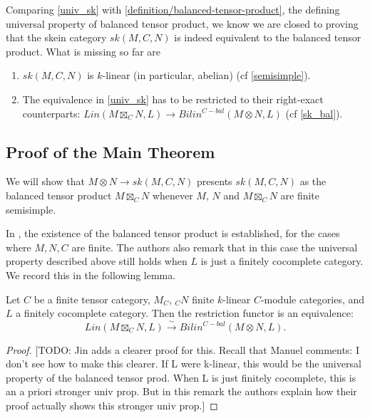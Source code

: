 \begin{remark}
  Comparing \ref{univ_sk} with \ref{definition/balanced-tensor-product}, the
  defining universal property of balanced tensor product, we know we are
  closed to proving that the skein category $sk(M,C,N)$ is indeed equivalent
  to the balanced tensor product. What is missing so far are

  \begin{enumerate}
    \item $sk(M,C,N)$ is $k$-linear (in particular, abelian) (cf \ref{semisimple}).
    \item The equivalence in \ref{univ_sk} has to be restricted to their
          right-exact counterparts:
          $Lin(M \boxtimes_{C} N, L) \to Bilin^{C-bal}(M \otimes N, L)$ (cf \ref{sk_bal}).
  \end{enumerate}
\end{remark}

\subsection{Proof of the Main Theorem}

We will show that $M\otimes N\to sk(M,C,N)$ presents $sk(M,C,N)$ as the
balanced tensor product $M\boxtimes_C N$ whenever $M$, $N$ and $M\boxtimes_C
N$ are finite semisimple.

In \cite{douglas/balanced-product}, the existence of the balanced tensor
product is established, for the cases where $M,N,C$ are finite. The authors
also remark that in this case the universal property described above still
holds when $L$ is just a finitely cocomplete category. We record this in the
following lemma.

\begin{lemma}\label{univ_box}

  \noindent
  Let $C$ be a finite tensor category, $M_C$, $_{C}N$ finite $k$-linear $C$-module
  categories, and $L$ a finitely cocomplete category. Then the restriction
  functor is an equivalence: \[Lin(M \boxtimes_{C} N, L) \xrightarrow{\sim} Bilin^{C-bal}(M \otimes N, L).\]
\end{lemma}

\begin{proof}
  \cite[Remark 3.4]{douglas/balanced-product} [TODO: Jin adds a clearer proof
  for this. Recall that Manuel comments: I don't see how to make this clearer.
  If L were k-linear, this would be the universal property of the balanced
  tensor prod. When L is just finitely cocomplete, this is an a priori
  stronger univ prop. But in this remark the authors explain how their proof
  actually shows this stronger univ prop.]
\end{proof}

